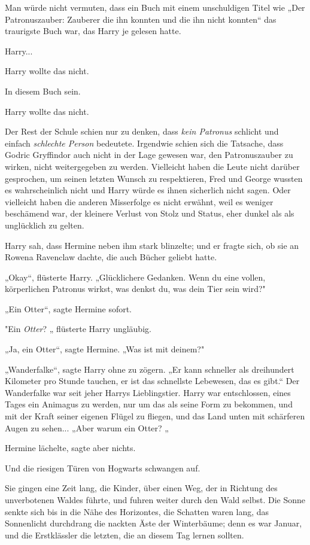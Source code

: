 {Man würde nicht vermuten, dass ein Buch mit einem unschuldigen Titel wie „Der Patronuszauber: Zauberer die ihn konnten und die ihn nicht konnten“ das traurigste Buch war, das Harry je gelesen hatte.

Harry...

Harry wollte das nicht.

In diesem Buch sein.

Harry wollte das nicht.

Der Rest der Schule schien nur zu denken, dass \emph{kein Patronus} schlicht und einfach \emph{schlechte Person} bedeutete. Irgendwie schien sich die Tatsache, dass Godric Gryffindor auch nicht in der Lage gewesen war, den Patronuszauber zu wirken, nicht weitergegeben zu werden. Vielleicht haben die Leute nicht darüber gesprochen, um seinen letzten Wunsch zu respektieren, Fred und George wussten es wahrscheinlich nicht und Harry würde es ihnen sicherlich nicht sagen. Oder vielleicht haben die anderen Misserfolge es nicht erwähnt, weil es weniger beschämend war, der kleinere Verlust von Stolz und Status, eher dunkel als als unglücklich zu gelten.

Harry sah, dass Hermine neben ihm stark blinzelte; und er fragte sich, ob sie an Rowena Ravenclaw dachte, die auch Bücher geliebt hatte.

„Okay“, flüsterte Harry. „Glücklichere Gedanken. Wenn du eine vollen, körperlichen Patronus wirkst, was denkst du, was dein Tier sein wird?"

„Ein Otter“, sagte Hermine sofort.

"Ein \emph{Otter}? „ flüsterte Harry ungläubig.

„Ja, ein Otter“, sagte Hermine. „Was ist mit deinem?"

„Wanderfalke“, sagte Harry ohne zu zögern. „Er kann schneller als dreihundert Kilometer pro Stunde tauchen, er ist das schnellste Lebewesen, das es gibt.“ Der Wanderfalke war seit jeher Harrys Lieblingstier. Harry war entschlossen, eines Tages ein Animagus zu werden, nur um das als seine Form zu bekommen, und mit der Kraft seiner eigenen Flügel zu fliegen, und das Land unten mit schärferen Augen zu sehen... „Aber warum ein Otter? „

Hermine lächelte, sagte aber nichts.

Und die riesigen Türen von Hogwarts schwangen auf.

Sie gingen eine Zeit lang, die Kinder, über einen Weg, der in Richtung des unverbotenen Waldes führte, und fuhren weiter durch den Wald selbst. Die Sonne senkte sich bis in die Nähe des Horizontes, die Schatten waren lang, das Sonnenlicht durchdrang die nackten Äste der Winterbäume; denn es war Januar, und die Erstklässler die letzten, die an diesem Tag lernen sollten.

}
